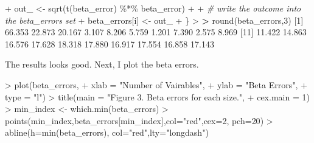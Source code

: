 \documentclass[
]{article}
\newenvironment{Shaded}{\begin{snugshade}}{\end{snugshade}}
\newcommand{\AttributeTok}[1]{\textcolor[rgb]{0.77,0.63,0.00}{#1}}
\newcommand{\CommentTok}[1]{\textcolor[rgb]{0.56,0.35,0.01}{\textit{#1}}}
\newcommand{\DecValTok}[1]{\textcolor[rgb]{0.00,0.00,0.81}{#1}}
\newcommand{\ErrorTok}[1]{\textcolor[rgb]{0.64,0.00,0.00}{\textbf{#1}}}
\newcommand{\FloatTok}[1]{\textcolor[rgb]{0.00,0.00,0.81}{#1}}
\newcommand{\FunctionTok}[1]{\textcolor[rgb]{0.00,0.00,0.00}{#1}}
\newcommand{\NormalTok}[1]{#1}
\newcommand{\OtherTok}[1]{\textcolor[rgb]{0.56,0.35,0.01}{#1}}
\newcommand{\SpecialCharTok}[1]{\textcolor[rgb]{0.00,0.00,0.00}{#1}}
\newcommand{\StringTok}[1]{\textcolor[rgb]{0.31,0.60,0.02}{#1}}
\begin{document}
\begin{Shaded}
\begin{Highlighting}[]
\SpecialCharTok{+}\NormalTok{   out\_ }\OtherTok{\textless{}{-}} \FunctionTok{sqrt}\NormalTok{(}\FunctionTok{t}\NormalTok{(beta\_error) }\SpecialCharTok{\%*\%}\NormalTok{ beta\_error)}
\SpecialCharTok{+}   
\SpecialCharTok{+}   \CommentTok{\# write the outcome into the beta\_errors set}
\SpecialCharTok{+}\NormalTok{   beta\_errors[i] }\OtherTok{\textless{}{-}}\NormalTok{ out\_}
\SpecialCharTok{+}\NormalTok{ \}}
\SpecialCharTok{\textgreater{}} 
\ErrorTok{\textgreater{}} \FunctionTok{round}\NormalTok{(beta\_errors,}\DecValTok{3}\NormalTok{)}
\NormalTok{ [}\DecValTok{1}\NormalTok{] }\FloatTok{66.353} \FloatTok{22.873} \FloatTok{20.167}  \FloatTok{3.107}  \FloatTok{8.206}  \FloatTok{5.759}  \FloatTok{1.201}  \FloatTok{7.390}  \FloatTok{2.575}  \FloatTok{8.969}
\NormalTok{[}\DecValTok{11}\NormalTok{] }\FloatTok{11.422} \FloatTok{14.863} \FloatTok{16.576} \FloatTok{17.628} \FloatTok{18.318} \FloatTok{17.880} \FloatTok{16.917} \FloatTok{17.554} \FloatTok{16.858} \FloatTok{17.143}
\end{Highlighting}
\end{Shaded}

The results looks good. Next, I plot the beta errors.

\begin{Shaded}
\begin{Highlighting}[]
\SpecialCharTok{\textgreater{}} \FunctionTok{plot}\NormalTok{(beta\_errors,}
\SpecialCharTok{+}      \AttributeTok{xlab =} \StringTok{"Number of Vairables"}\NormalTok{,}
\SpecialCharTok{+}      \AttributeTok{ylab =} \StringTok{"Beta Errors"}\NormalTok{,}
\SpecialCharTok{+}      \AttributeTok{type =} \StringTok{"l"}\NormalTok{)}
\SpecialCharTok{\textgreater{}} \FunctionTok{title}\NormalTok{(}\AttributeTok{main =} \StringTok{"Figure 3. Beta errors for each size."}\NormalTok{, }
\SpecialCharTok{+}       \AttributeTok{cex.main =} \DecValTok{1}\NormalTok{)}
\SpecialCharTok{\textgreater{}}\NormalTok{ min\_index }\OtherTok{\textless{}{-}} \FunctionTok{which.min}\NormalTok{(beta\_errors)}
\SpecialCharTok{\textgreater{}} \FunctionTok{points}\NormalTok{(min\_index,beta\_errors[min\_index],}\AttributeTok{col=}\StringTok{"red"}\NormalTok{,}\AttributeTok{cex=}\DecValTok{2}\NormalTok{, }\AttributeTok{pch=}\DecValTok{20}\NormalTok{)}
\SpecialCharTok{\textgreater{}} \FunctionTok{abline}\NormalTok{(}\AttributeTok{h=}\FunctionTok{min}\NormalTok{(beta\_errors), }\AttributeTok{col=}\StringTok{"red"}\NormalTok{,}\AttributeTok{lty=}\StringTok{"longdash"}\NormalTok{)}
\end{Highlighting}
\end{Shaded}
\end{document}
